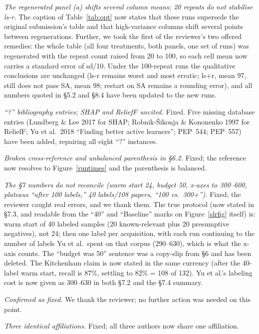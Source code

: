 \documentclass[AMA,STIX2COL]{WileyNJDv5}
\begin{document}
\smallskip{} {\em The regenerated panel (a) shifts several
column means; 20 repeats do not stabilise \textsf{ls-r}.} The
caption of Table~\ref{tab:opt} now states that these runs
supersede the original submission's table and that high-variance
columns shift several points between regenerations. Further, we
took the first of the reviewer's two offered remedies: the whole
table (all four treatments, both panels, one set of runs) was
regenerated with the repeat count raised from 20 to 100, so each
cell mean now carries a standard error of sd/10. Under the
100-repeat runs the qualitative conclusions are unchanged
(\textsf{ls-r} remains worst and most erratic;
\textsf{ls+r}, mean 97, still does not pass SA, mean 98;
restart on SA remains a rounding error), and all numbers quoted
in \S5.2 and \S8.4 have been updated to the new runs.

\smallskip{} {\em ``?'' bibliography entries; SHAP and
ReliefF uncited.} Fixed. Five missing database entries
(Lundberg \& Lee 2017 for SHAP; Robnik-\v{S}ikonja \&
Kononenko 1997 for ReliefF; Yu et al.\ 2018 ``Finding better
active learners''; PEP~544; PEP~557) have been added, repairing
all eight ``?'' instances.

\smallskip{} {\em Broken cross-reference and unbalanced
parenthesis in \S6.2.} Fixed; the reference now resolves to
Figure~\ref{runtimes} and the parenthesis is balanced.

\smallskip{} {\em The \S7 numbers do not reconcile (warm
start 24, budget 50, x-axes to 300--600, plateaus ``after 100
labels,'' 40 labels/108 papers, ``100 vs.\ 300+'').} Fixed; the
reviewer caught real errors, and we thank them. The true protocol
(now stated in \S7.3, and readable from the ``40'' and
``Baseline'' marks on Figure~\ref{slrfig} itself) is: warm start
of 40 labeled samples (20 known-relevant plus 20 presumptive
negatives), not 24; then one label per acquisition, with each run
continuing to the number of labels Yu et al.\ spent on that
corpus (290--630), which is what the x-axis counts. The ``budget
was 50'' sentence was a copy-slip from \S6 and has been deleted.
The Kitchenham claim is now stated in the same currency (after
the 40-label warm start, recall is 87\%, settling to 82\% = 108
of 132). Yu et al.'s labeling cost is now given as 300--630 in
both \S7.2 and the \S7.4 summary.

\smallskip{} {\em Confirmed as fixed.} We
thank the reviewer; no further action was needed on this point.

\smallskip{} {\em Three identical affiliations.} Fixed;
all three authors now share one affiliation.

\color{black}
\end{document}
